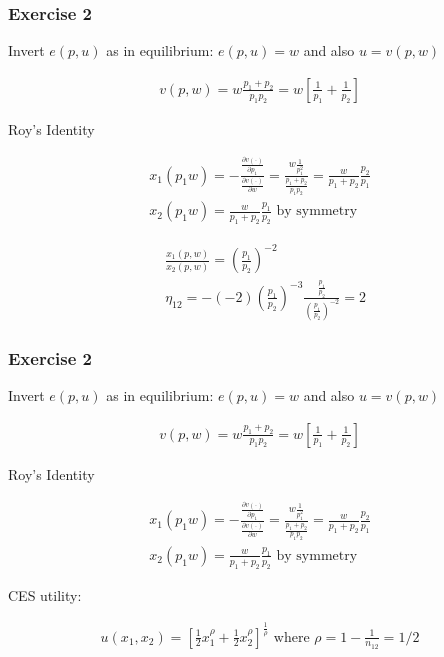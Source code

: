 {
\subsubsection*{Exercise 2}

\begin{enumerate}[label=(\alph*)]
{\item 
Invert $e(p,u)$ as in equilibrium: $e(p, u)=w$ and also $u=v(p, w)$

\begin{align*}
    v\left(p, w\right)=w \frac{p_{1}+p_{2}}{p_{1} p_{2}}=w\left[\frac{1}{p_{1}}+\frac{1}{p_{2}}\right]
\end{align*}
}
{\item 
Roy's Identity

\begin{align*}
    x_1\left(p_1 w\right)=-\frac{\frac{\partial v(\cdot)}{\partial p_1}}{\frac{\partial v(\cdot)}{\partial w}}=\frac{w \frac{1}{p_1^2}}{\frac{p_1+p_2}{p_1 p_2}}=\frac{w}{p_1+p_2}\frac{p_2}{p_1} \\
    x_2\left(p_1 w\right)=\frac{w}{p_1+p_2} \frac{p_1}{p_2} \text { by symmetry }
\end{align*}
}
{\item 
\begin{align*}
    & \frac{x_1\left(p, w\right)}{x_2\left(p, w\right)}=\left(\frac{p_1}{p_2}\right)^{-2} \\
    & \eta_{12}=-(-2)\left(\frac{p_1}{p_2}\right)^{-3} \frac{\frac{p_1}{p_2}}{\left(\frac{p_1}{p_2}\right)^{-2}}=2
\end{align*}
}
\end{enumerate}
}
{
\subsubsection*{Exercise 2}

\begin{enumerate}[label=(\alph*)]
{\item 
Invert $e(p,u)$ as in equilibrium: $e(p, u)=w$ and also $u=v(p, w)$

\begin{align*}
    v\left(p, w\right)=w \frac{p_{1}+p_{2}}{p_{1} p_{2}}=w\left[\frac{1}{p_{1}}+\frac{1}{p_{2}}\right]
\end{align*}
}
{\item 
Roy's Identity

\begin{align*}
    x_1\left(p_1 w\right)=-\frac{\frac{\partial v(\cdot)}{\partial p_1}}{\frac{\partial v(\cdot)}{\partial w}}=\frac{w \frac{1}{p_1^2}}{\frac{p_1+p_2}{p_1 p_2}}=\frac{w}{p_1+p_2}\frac{p_2}{p_1} \\
    x_2\left(p_1 w\right)=\frac{w}{p_1+p_2} \frac{p_1}{p_2} \text { by symmetry }
\end{align*}
}
{\item 
CES utility:

\begin{align*}
    u\left(x_1, x_2\right)=\left[\frac{1}{2} x_1^\rho+\frac{1}{2} x_2^\rho\right]^{\frac{1}{\rho}} \text { where } \rho=1-\frac{1}{n_{12}}=1 / 2
\end{align*}
}
\end{enumerate}
}
